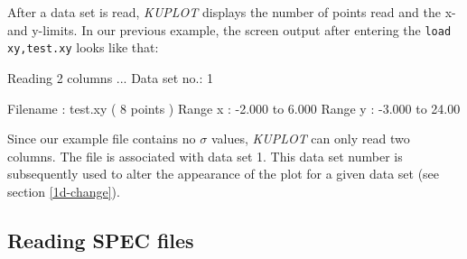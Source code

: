After a data set is read, {\it KUPLOT} displays the number of points
read and the x- and y-limits. In our previous example, the screen
output after entering the {\tt load xy,test.xy} looks like that:
%
\begin{MacVerbatim}
    Reading 2 columns ...
    Data set no.:   1

      Filename : test.xy                            (     8 points )
      Range  x :   -2.000     to    6.000
      Range  y :   -3.000     to    24.00
\end{MacVerbatim}
%
Since our example file contains no $\sigma$ values, {\it KUPLOT} can
only read two columns. The file is associated with data set 1. This
data set number is subsequently used to alter the appearance of the
plot for a given data set (see section \ref{1d-change}).

\subsection*{Reading SPEC files}


